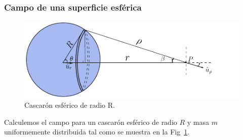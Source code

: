 \subsubsection{Campo de una superficie esférica}
%
\begin{figure}[h]
\begin{center}
\includegraphics[scale=0.9]{gravitacion/esfera1}
\end{center}
\caption{Cascarón esférico de radio R.}
\label{fig:gravitacion-esfera}
\end{figure}
%
Calculemos el campo para un cascarón esférico de radio $R$ y masa $m$ uniformemente distribuida tal como se muestra en la Fig~\ref{fig:gravitacion-esfera}.

